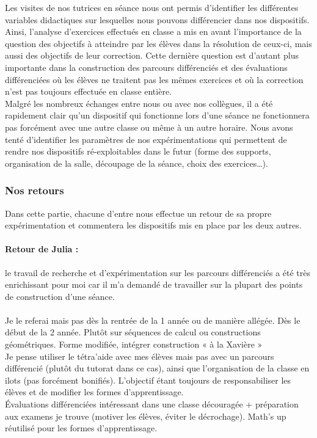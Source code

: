 Les visites de nos tutrices en séance nous ont permis d'identifier les différentes variables didactiques sur lesquelles nous pouvons différencier dans nos dispositifs. Ainsi, l'analyse d'exercices effectués en classe a mis en avant l'importance de la question des objectifs à atteindre par les élèves dans la résolution de ceux-ci, mais aussi des objectifs de leur correction. Cette dernière question est d'autant plus importante dans la construction des parcours différenciés et des évaluations différenciées où les élèves ne traitent pas les mêmes exercices et où la correction n'est pas toujours effectuée en classe entière.\\
Malgré les nombreux échanges entre nous ou avec nos collègues, il a été rapidement clair qu'un dispositif qui fonctionne lors d'une séance ne fonctionnera pas forcément avec une autre classe ou même à un autre horaire. Nous avons tenté d'identifier les paramètres de nos expérimentations qui permettent de rendre nos dispositifs ré-exploitables dans le futur (forme des supports, organisation de la salle, découpage de la séance, choix des exercices\ldots).

\subsubsection{Nos retours}\label{sec:retours}
Dans cette partie, chacune d'entre nous effectue un retour de sa propre expérimentation et commentera les dispositifs mis en place par les deux autres.\\
\paragraph*{Retour de Julia :}
le travail de recherche et d'expérimentation sur les parcours différenciés a été très enrichissant pour moi car il m'a demandé de travailler sur la plupart des points de construction d'une séance. \\
\\
Je le referai mais pas dès la rentrée de la 1 année ou de manière allégée. Dès le début de la 2 année. Plutôt sur séquences de calcul ou constructions géométriques. Forme modifiée, intégrer construction « à la Xavière »\\
Je pense utiliser le tétra'aide avec mes élèves mais pas avec un parcours différencié (plutôt du tutorat dans ce cas), ainsi que l'organisation de la classe en ilots (pas forcément bonifiés). L'objectif étant toujours de responsabiliser les élèves et de modifier les formes d'apprentissage.\\
Évaluations différenciées intéressant dans une classe découragée + préparation aux examens je trouve (motiver les élèves, éviter le décrochage).
Math's up réutilisé pour les formes d'apprentissage.

